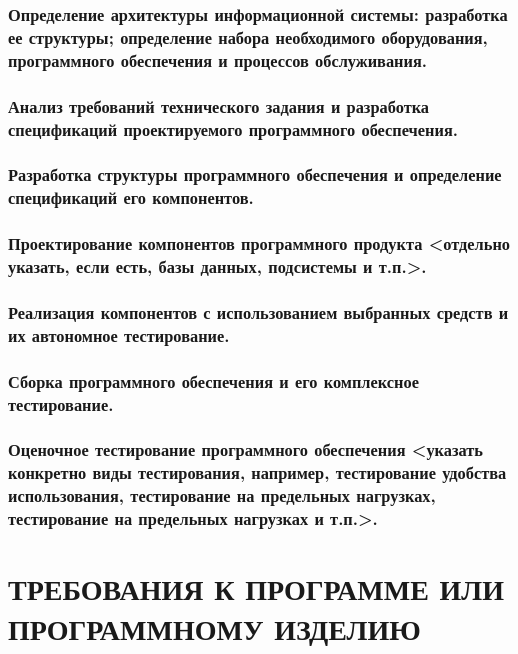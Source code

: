 \documentclass[12pt, left=30mm, right=15mm, top=20mm, bottom=20mm]{templateReportBMSTU}
\begin{document}
	\subsubsection{\textbf{Определение архитектуры информационной системы: разработка ее структуры; определение набора необходимого оборудования, программного обеспечения и процессов обслуживания.}}

	\subsubsection{Анализ требований технического задания и разработка спецификаций проектируемого программного обеспечения.}

	\subsubsection{Разработка структуры программного обеспечения и определение спецификаций его компонентов.}

	\subsubsection{Проектирование компонентов программного продукта \textbf{<отдельно указать, если есть, базы данных, подсистемы и т.п.>.}}

	\subsubsection{Реализация компонентов с использованием выбранных средств и их автономное тестирование.}

	\subsubsection{Сборка программного обеспечения и его комплексное тестирование.}

	\subsubsection{Оценочное тестирование программного обеспечения \textbf{<указать конкретно виды тестирования, например, тестирование удобства использования, тестирование на предельных нагрузках, тестирование на предельных нагрузках и т.п.>.}}

	\section{ТРЕБОВАНИЯ \textbf{К ПРОГРАММЕ ИЛИ ПРОГРАММНОМУ ИЗДЕЛИЮ}}
\end{document}
